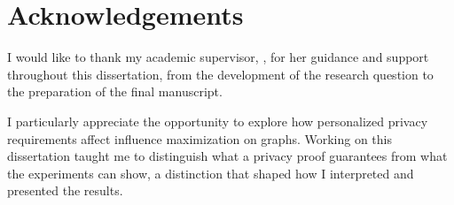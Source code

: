 \chapter*{Acknowledgements}
I would like to thank my academic supervisor, \academicsupervisor, for her guidance and support throughout this dissertation, from the development of the research question to the preparation of the final manuscript.

I particularly appreciate the opportunity to explore how personalized privacy requirements affect influence maximization on graphs. Working on this dissertation taught me to distinguish what a privacy proof guarantees from what the experiments can show, a distinction that shaped how I interpreted and presented the results.
\clearpage

